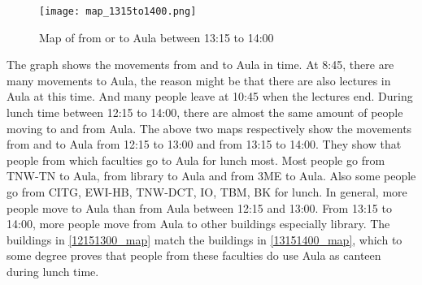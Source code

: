 \begin{figure}[H]
	\centering
	\texttt{[image: map\_1315to1400.png]}
	\captionsetup{justification=centering}
	\caption{Map of from or to Aula between 13:15 to 14:00}
	\label{13151400_map}
\end{figure}
The graph shows the movements from and to Aula in time. At 8:45, there are many movements to Aula, the reason might be that there are also lectures in Aula at this time. And many people leave at 10:45 when the lectures end. During lunch time between 12:15 to 14:00, there are almost the same amount of people moving to and from Aula.
The above two maps respectively show the movements from and to Aula from 12:15 to 13:00 and from 13:15 to 14:00. They show that people from which faculties go to Aula for lunch most.
Most people go from TNW-TN to Aula, from library to Aula and from 3ME to Aula. Also some people go from CITG, EWI-HB, TNW-DCT, IO, TBM, BK for lunch. In general, more people move to Aula than from Aula between 12:15 and 13:00. From 13:15 to 14:00, more people move from Aula to other buildings especially library. The buildings in \autoref{12151300_map} match the buildings in \autoref{13151400_map}, which to some degree proves that people from these faculties do use Aula as canteen during lunch time.